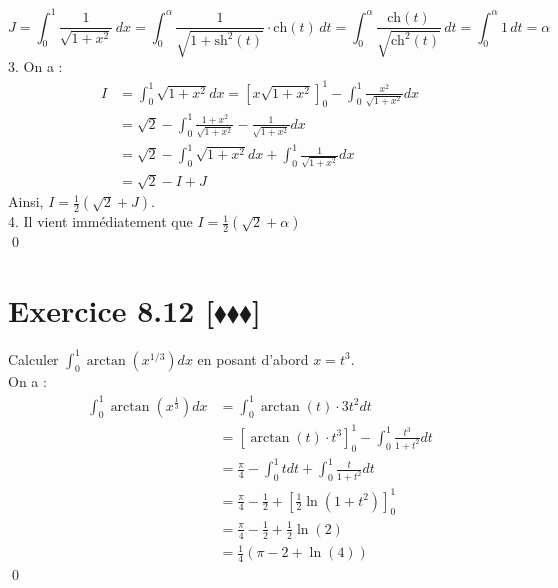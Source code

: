 \documentclass[10pt]{article}
\begin{document}
\begin{tcolorbox}[enhanced, width=7in, center, size=fbox, fontupper=\large, drop shadow southwest]
\begin{equation*}
        J = \int_0^1 \frac{1}{\sqrt{1+x^2}} \, dx = \int_0^\alpha \frac{1}{\sqrt{1+\text{sh}^2(t)}} \cdot \text{ch}(t) \, dt = \int_0^\alpha \frac{\text{ch}(t)}{\sqrt{\text{ch}^2(t)}} \, dt = \int_0^\alpha 1 \, dt = \alpha
    \end{equation*}
    3. On a :
    \begin{align*}
        I &= \int_0^1{\sqrt{1+x^2}dx}=\left[x\sqrt{1+x^2}\right]_0^1 - \int_0^1{\frac{x^2}{\sqrt{1+x^2}}dx}\\
        &= \sqrt{2} - \int_0^1{\frac{1+x^2}{\sqrt{1+x^2}}-\frac{1}{\sqrt{1+x^2}}dx}\\
        &=\sqrt{2} - \int_0^1{\sqrt{1+x^2}dx} + \int_0^1{\frac{1}{\sqrt{1+x^2}}dx}\\
        &=\sqrt{2} - I + J
    \end{align*}
    Ainsi, $I = \frac{1}{2}\left(\sqrt{2} + J\right)$.\\
    4. Il vient immédiatement que $I=\frac{1}{2}\left(\sqrt{2}+\alpha\right)$\\
    \qed
\end{tcolorbox}


\section*{Exercice 8.12 [$\blacklozenge\blacklozenge\blacklozenge$]}
\begin{tcolorbox}[enhanced, width=7in, center, size=fbox, fontupper=\large, drop shadow southwest]
    Calculer $\int_0^1{\arctan(x^{1/3})dx}$ en posant d'abord $x=t^3$.\\
    On a :
    \begin{align*}
        \int_0^1{\arctan(x^{\frac{1}{3}})dx}&=\int_0^1{\arctan(t)\cdot3t^2dt}\\
        &=\left[\arctan(t)\cdot t^3\right]_0^1 - \int_0^1{\frac{t^3}{1+t^2} dt}\\
        &=\frac{\pi}{4} - \int_0^1{tdt}+\int_0^1{\frac{t}{1+t^2}dt}\\
        &=\frac{\pi}{4} - \frac{1}{2} + \left[\frac{1}{2}\ln(1+t^2)\right]_0^1\\
        &=\frac{\pi}{4} - \frac{1}{2} + \frac{1}{2}\ln(2)\\
        &=\frac{1}{4}\left(\pi - 2 + \ln(4)\right)
    \end{align*}
    \qed
\end{tcolorbox}
\end{document}
